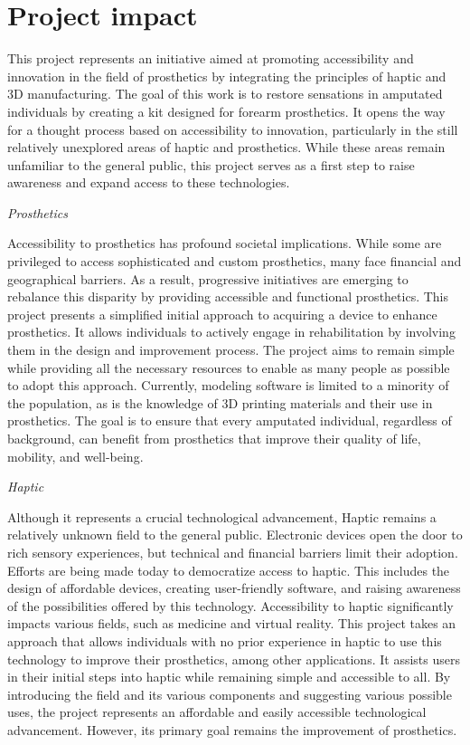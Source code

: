 \section{Project impact}
This project represents an initiative aimed at promoting accessibility and innovation in the field of prosthetics by integrating the principles of haptic and 3D manufacturing. The goal of this work is to restore sensations in amputated individuals by creating a kit designed for forearm prosthetics. It opens the way for a thought process based on accessibility to innovation, particularly in the still relatively unexplored areas of haptic and prosthetics. While these areas remain unfamiliar to the general public, this project serves as a first step to raise awareness and expand access to these technologies.

\textit{Prosthetics}

Accessibility to prosthetics has profound societal implications. While some are privileged to access sophisticated and custom prosthetics, many face financial and geographical barriers. As a result, progressive initiatives are emerging to rebalance this disparity by providing accessible and functional prosthetics. This project presents a simplified initial approach to acquiring a device to enhance prosthetics. It allows individuals to actively engage in rehabilitation by involving them in the design and improvement process. The project aims to remain simple while providing all the necessary resources to enable as many people as possible to adopt this approach. Currently, modeling software is limited to a minority of the population, as is the knowledge of 3D printing materials and their use in prosthetics. The goal is to ensure that every amputated individual, regardless of background, can benefit from prosthetics that improve their quality of life, mobility, and well-being.

\textit{Haptic}

Although it represents a crucial technological advancement, Haptic remains a relatively unknown field to the general public. Electronic devices open the door to rich sensory experiences, but technical and financial barriers limit their adoption. Efforts are being made today to democratize access to haptic. This includes the design of affordable devices, creating user-friendly software, and raising awareness of the possibilities offered by this technology. Accessibility to haptic significantly impacts various fields, such as medicine and virtual reality. This project takes an approach that allows individuals with no prior experience in haptic to use this technology to improve their prosthetics, among other applications. It assists users in their initial steps into haptic while remaining simple and accessible to all. By introducing the field and its various components and suggesting various possible uses, the project represents an affordable and easily accessible technological advancement. However, its primary goal remains the improvement of prosthetics.

